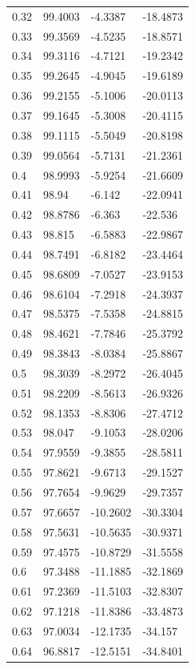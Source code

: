 \begin{tabular}{llll}
0.32 & 99.4003 & -4.3387 & -18.4873 \\
0.33 & 99.3569 & -4.5235 & -18.8571 \\
0.34 & 99.3116 & -4.7121 & -19.2342 \\
0.35 & 99.2645 & -4.9045 & -19.6189 \\
0.36 & 99.2155 & -5.1006 & -20.0113 \\
0.37 & 99.1645 & -5.3008 & -20.4115 \\
0.38 & 99.1115 & -5.5049 & -20.8198 \\
0.39 & 99.0564 & -5.7131 & -21.2361 \\
0.4 & 98.9993 & -5.9254 & -21.6609 \\
0.41 & 98.94 & -6.142 & -22.0941 \\
0.42 & 98.8786 & -6.363 & -22.536 \\
0.43 & 98.815 & -6.5883 & -22.9867 \\
0.44 & 98.7491 & -6.8182 & -23.4464 \\
0.45 & 98.6809 & -7.0527 & -23.9153 \\
0.46 & 98.6104 & -7.2918 & -24.3937 \\
0.47 & 98.5375 & -7.5358 & -24.8815 \\
0.48 & 98.4621 & -7.7846 & -25.3792 \\
0.49 & 98.3843 & -8.0384 & -25.8867 \\
0.5 & 98.3039 & -8.2972 & -26.4045 \\
0.51 & 98.2209 & -8.5613 & -26.9326 \\
0.52 & 98.1353 & -8.8306 & -27.4712 \\
0.53 & 98.047 & -9.1053 & -28.0206 \\
0.54 & 97.9559 & -9.3855 & -28.5811 \\
0.55 & 97.8621 & -9.6713 & -29.1527 \\
0.56 & 97.7654 & -9.9629 & -29.7357 \\
0.57 & 97.6657 & -10.2602 & -30.3304 \\
0.58 & 97.5631 & -10.5635 & -30.9371 \\
0.59 & 97.4575 & -10.8729 & -31.5558 \\
0.6 & 97.3488 & -11.1885 & -32.1869 \\
0.61 & 97.2369 & -11.5103 & -32.8307 \\
0.62 & 97.1218 & -11.8386 & -33.4873 \\
0.63 & 97.0034 & -12.1735 & -34.157 \\
0.64 & 96.8817 & -12.5151 & -34.8401 \\

\end{tabular}
